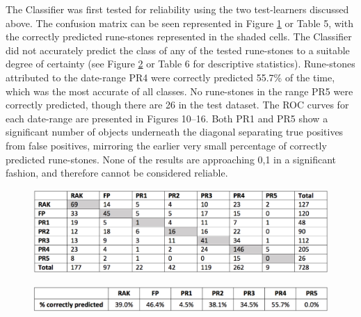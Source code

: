 
The Classifier was first tested for reliability using the two test-learners discussed above. The confusion matrix can be seen represented in Figure \ref{fig:Table5} or Table 5, with the correctly predicted rune-stones represented in the shaded cells. The Classifier did not accurately predict the class of any of the tested rune-stones to a suitable degree of certainty (see Figure \ref{fig:Table6} or Table 6 for descriptive statistics). Rune-stones attributed to the date-range PR4 were correctly predicted 55.7\% of the time, which was the most accurate of all classes. No rune-stones in the range PR5 were correctly predicted, though there are 26 in the test dataset. The ROC curves for each date-range are presented in Figures 10--16. Both PR1 and PR5 show a significant number of objects underneath the diagonal separating true positives from false positives, mirroring the earlier very small percentage of correctly predicted rune-stones. None of the results are approaching 0,1 in a significant fashion, and therefore cannot be considered reliable.

\begin{figure}[!htb]
	\includegraphics[width=.95\linewidth]{figures/thoeming_Table5}
	\centering
	\label{fig:Table5}
\end{figure}

\begin{figure}[!htb]
	\includegraphics[width=.95\linewidth]{figures/thoeming_Table6}
	\centering
	\label{fig:Table6}
\end{figure}

